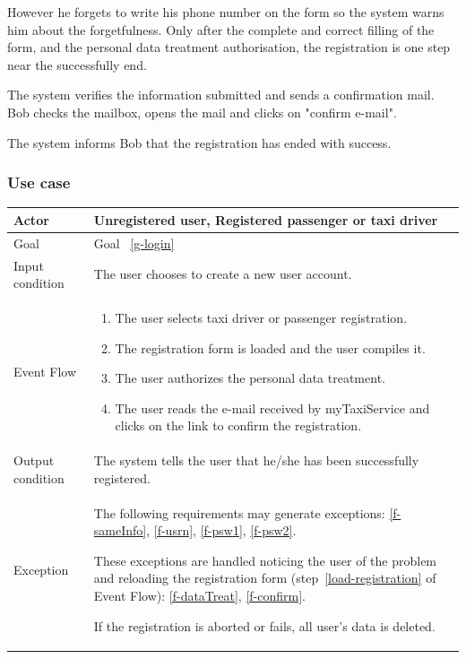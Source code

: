 However he forgets to write his phone number on the form so the system warns him about the forgetfulness.
Only after the complete and correct filling of the form, and the personal data treatment authorisation, the registration is one step near the successfully end.

The system verifies the information submitted and sends a confirmation mail.
Bob checks the mailbox, opens the mail and clicks on "confirm e-mail".

The system informs Bob that the registration has ended with success.



\subsubsection{Use case}
\begin{center}
\begin{tabular}{| l | p{} |}
\hline
Actor & Unregistered user, Registered passenger or taxi driver \\
\hline
Goal & Goal ~\ref{g-login}
\\
\hline
Input condition & The user chooses to create a new user account.  \\
\hline
Event Flow & \begin{enumerate}
	\item The user selects taxi driver or passenger registration.
	\item The registration form is loaded and the user compiles it.\label{load-registration}
	\item The user authorizes the personal data treatment.
	\item The user reads the e-mail received by myTaxiService and clicks on the link to confirm the registration.
	\end{enumerate}
\\
\hline
Output condition & The system tells the user that he/she has been successfully registered. \\
\hline

Exception &  The following requirements may generate exceptions:
	\ref{f-sameInfo},    %
	\ref{f-usrn},       %
	\ref{f-psw1},     %
	\ref{f-psw2}.    %

These exceptions are handled noticing the user of the problem and reloading the registration form (step~\ref{load-registration} of Event Flow):
\ref{f-dataTreat},   %
\ref{f-confirm}.   %

If the registration is aborted or fails, all user's data is deleted.

 \\
\hline
\end{tabular}
\end{center}


